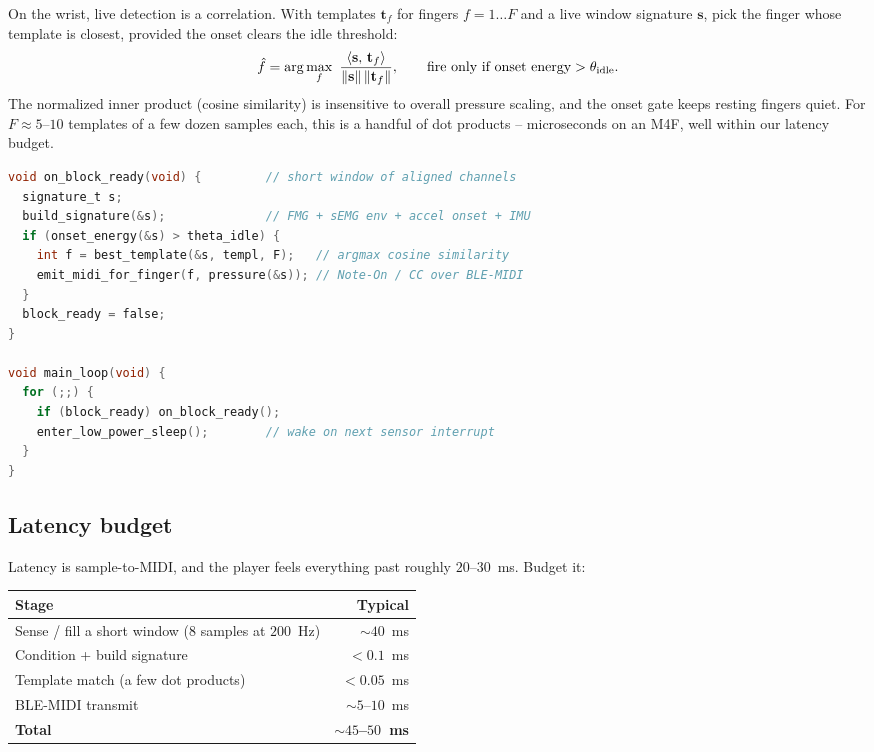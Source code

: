 On the wrist, live detection is a correlation. With templates $\mathbf{t}_f$ for fingers
$f=1\dots F$ and a live window signature $\mathbf{s}$, pick the finger whose template is closest,
provided the onset clears the idle threshold:
\[
  \hat{f} = \arg\max_{f}\ \frac{\inner{\mathbf{s}}{\mathbf{t}_f}}{\norm{\mathbf{s}}\,\norm{\mathbf{t}_f}},
  \qquad\text{fire only if onset energy} > \theta_{\text{idle}}.
\]
The normalized inner product (cosine similarity) is insensitive to overall pressure scaling, and the
onset gate keeps resting fingers quiet. For $F\approx 5$--$10$ templates of a few dozen samples
each, this is a handful of dot products -- microseconds on an M4F, well within our latency budget.

\begin{lstlisting}[language=C, caption={Live loop: condition, match against calibrated templates, emit MIDI.}]
void on_block_ready(void) {         // short window of aligned channels
  signature_t s;
  build_signature(&s);              // FMG + sEMG env + accel onset + IMU
  if (onset_energy(&s) > theta_idle) {
    int f = best_template(&s, templ, F);   // argmax cosine similarity
    emit_midi_for_finger(f, pressure(&s)); // Note-On / CC over BLE-MIDI
  }
  block_ready = false;
}

void main_loop(void) {
  for (;;) {
    if (block_ready) on_block_ready();
    enter_low_power_sleep();        // wake on next sensor interrupt
  }
}
\end{lstlisting}

\subsection{Latency budget}

Latency is sample-to-MIDI, and the player feels everything past roughly $20$--$30$~ms. Budget it:

\begin{center}
\small
\begin{tabular}{@{}lr@{}}
\toprule
Stage & Typical \\
\midrule
Sense / fill a short window (8 samples at $200$~Hz) & $\sim 40$~ms \\
Condition + build signature & $< 0.1$~ms \\
Template match (a few dot products) & $< 0.05$~ms \\
BLE-MIDI transmit & $\sim 5$--$10$~ms \\
\midrule
\textbf{Total} & \textbf{$\sim 45$--$50$~ms} \\
\bottomrule
\end{tabular}
\end{center}

